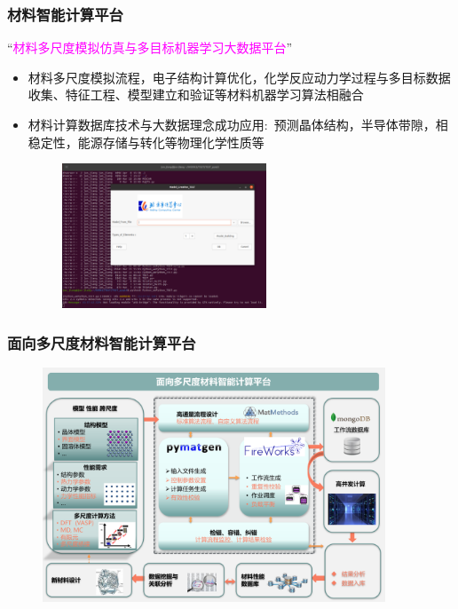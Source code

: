 \begin{frame}
	\frametitle{材料智能计算平台}
	“\textcolor{magenta}{材料多尺度模拟仿真与多目标机器学习大数据平台}”
	\begin{itemize}
		\item 材料多尺度模拟流程，电子结构计算优化，化学反应动力学过程与多目标数据收集、特征工程、模型建立和验证等材料机器学习算法相融合
		\item 材料计算数据库技术与大数据理念成功应用:~预测晶体结构，半导体带隙，相稳定性，能源存储与转化等物理化学性质等
	\end{itemize}
\begin{figure}[h!]
\centering
\vspace*{-7pt}
\includegraphics[height=1.70in,width=2.85in,viewport=0 0 1200 870,clip]{Figures/BCC-Process_1.png}
\label{BCC-Process_1}
\end{figure}
\end{frame}

\begin{frame}
	\frametitle{面向多尺度材料智能计算平台}
\begin{figure}[h!]
\centering
\includegraphics[height=2.75in]{Figures/MP_comp_BCC-2.png}
\label{MP_comp_BCC_2}
\end{figure}
\end{frame}

